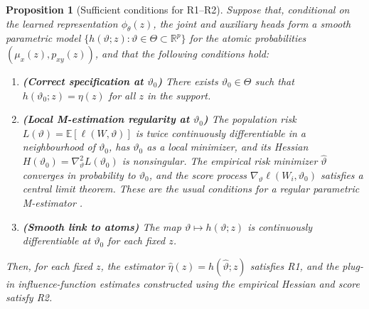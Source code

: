 \documentclass[accepted]{uai2026} %
\theoremstyle{plain}
\newtheorem{proposition}[theorem]{Proposition}
\theoremstyle{definition}
\theoremstyle{remark}
\begin{document}
\begin{proposition}[Sufficient conditions for R1--R2]\label{prop:m-estimation}
Suppose that, conditional on the learned representation $\phi_\theta(z)$, the joint and auxiliary heads 
form a smooth parametric model $\{h(\vartheta; z) : \vartheta \in \Theta \subset \mathbb{R}^p\}$ 
for the atomic probabilities $(\mu_x(z), p_{xy}(z))$, and that the following conditions hold:
\begin{enumerate} %
\item \textbf{(Correct specification at $\vartheta_0$)} 
There exists $\vartheta_0 \in \Theta$ such that $h(\vartheta_0; z) = \eta(z)$ for all $z$ in the support.

\item \textbf{(Local M-estimation regularity at $\vartheta_0$)} 
The population risk $L(\vartheta) = \mathbb{E}[\ell(W, \vartheta)]$ is twice continuously differentiable 
in a neighbourhood of $\vartheta_0$, has $\vartheta_0$ as a local minimizer, and its Hessian 
$H(\vartheta_0) = \nabla^2_\vartheta L(\vartheta_0)$ is nonsingular. 
The empirical risk minimizer $\hat{\vartheta}$ converges in probability to $\vartheta_0$, 
and the score process $\nabla_\vartheta \ell(W_i, \vartheta_0)$ satisfies a central limit theorem. 
These are the usual conditions for a regular parametric M-estimator 
\citep{newey1994largesample,vandervaart1998asymptotic}.

\item \textbf{(Smooth link to atoms)} 
The map $\vartheta \mapsto h(\vartheta; z)$ is continuously differentiable at $\vartheta_0$ for each fixed $z$.
\end{enumerate}
%
Then, for each fixed $z$, the estimator $\hat{\eta}(z) = h(\hat{\vartheta}; z)$ satisfies R1, 
and the plug-in influence-function estimates constructed using the empirical Hessian and score satisfy R2.
\end{proposition}
\end{document}
